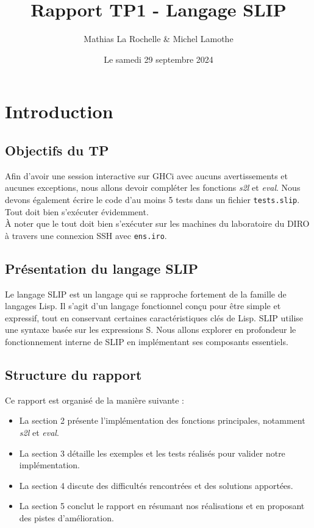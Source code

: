 \documentclass{article}
\title{Rapport TP1 - Langage SLIP}
\author{Mathias La Rochelle \& Michel Lamothe}
\date{Le samedi 29 septembre 2024}
\begin{document}
\maketitle

\section{Introduction}
\subsection{Objectifs du TP}
    Afin d'avoir une session interactive sur GHCi avec aucuns avertissements et aucunes exceptions, nous allons devoir compléter
    les fonctions \textit{s2l} et \textit{eval}. Nous devons également écrire le code d'au moins 5 tests dans un fichier \texttt{tests.slip}. Tout doit bien s'exécuter
    évidemment. \\

    \noindent À noter que le tout doit bien s'exécuter sur les machines du laboratoire du DIRO à travers une connexion SSH avec \texttt{ens.iro}.
    \subsection{Présentation du langage SLIP}
    Le langage SLIP est un langage qui se rapproche fortement de la famille de langages Lisp. Il s'agit d'un langage fonctionnel
    conçu pour être simple et expressif, tout en conservant certaines caractéristiques clés de Lisp. SLIP utilise une syntaxe
    basée sur les expressions S. Nous allons explorer en profondeur le fonctionnement interne de SLIP en implémentant ses composants essentiels.

\subsection{Structure du rapport}
    Ce rapport est organisé de la manière suivante :
    \begin{itemize}
        \item La section 2 présente l'implémentation des fonctions principales, notamment \textit{s2l} et \textit{eval}.
        \item La section 3 détaille les exemples et les tests réalisés pour valider notre implémentation.
        \item La section 4 discute des difficultés rencontrées et des solutions apportées.
        \item La section 5 conclut le rapport en résumant nos réalisations et en proposant des pistes d'amélioration.
    \end{itemize}
\end{document}
